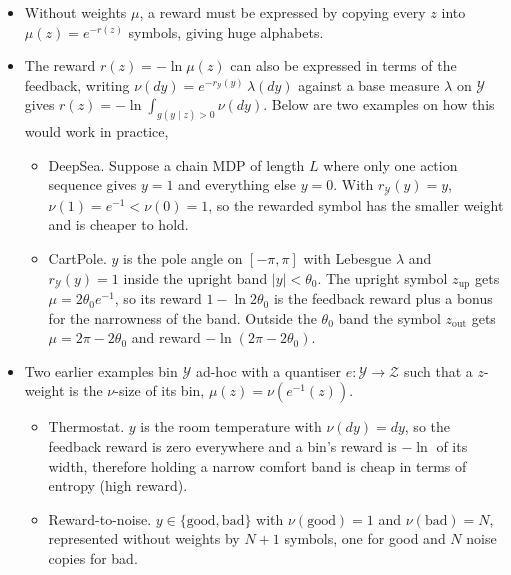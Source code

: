 \documentclass[10pt]{article}
\begin{document}
\begin{itemize}
  \item Without weights $\mu$, a reward must be expressed by copying every $z$ into $\mu(z) = e^{-r(z)}$ symbols, giving huge alphabets.
  \item The reward $r(z) = -\ln \mu(z)$ can also be expressed in terms of the feedback, writing $\nu(dy) = e^{-r_{\mathcal Y}(y)}\,\lambda(dy)$ against a base measure $\lambda$ on $\mathcal Y$ gives $r(z) = -\ln \int_{g(y \mid z) > 0} \nu(dy)$. Below are two examples on how this would work in practice,
  \begin{itemize}
    \item DeepSea. Suppose a chain MDP of length $L$ where only one action sequence gives $y = 1$ and everything else $y = 0$. With $r_{\mathcal Y}(y) = y$, $\nu(1) = e^{-1} < \nu(0) = 1$, so the rewarded symbol has the smaller weight and is cheaper to hold.
    \item CartPole. $y$ is the pole angle on $[-\pi,\pi]$ with Lebesgue $\lambda$ and $r_{\mathcal Y}(y) = 1$ inside the upright band $|y| < \theta_0$. The upright symbol $z_{\text{up}}$ gets $\mu = 2\theta_0 e^{-1}$, so its reward $1 - \ln 2\theta_0$ is the feedback reward plus a bonus for the narrowness of the band.
    Outside the $\theta_0$ band the symbol $z_{\text{out}}$ gets $\mu = 2\pi - 2\theta_0$ and reward $-\ln(2\pi - 2\theta_0)$.
  \end{itemize}
  \item Two earlier examples bin $\mathcal Y$ ad-hoc with a quantiser $e: \mathcal Y \to \mathcal Z$ such that a $z$-weight is the $\nu$-size of its bin, $\mu(z) = \nu(e^{-1}(z))$.
  \begin{itemize}
    \item Thermostat. $y$ is the room temperature with $\nu(dy) = dy$, so the feedback reward is zero everywhere and a bin's reward is $-\ln$ of its width, therefore holding a narrow comfort band is cheap in terms of entropy (high reward).
    \item Reward-to-noise. $y \in \{\text{good}, \text{bad}\}$ with $\nu(\text{good}) = 1$ and $\nu(\text{bad}) = N$, represented without weights by $N + 1$ symbols, one for good and $N$ noise copies for bad.
  \end{itemize}
\end{itemize}
\end{document}
